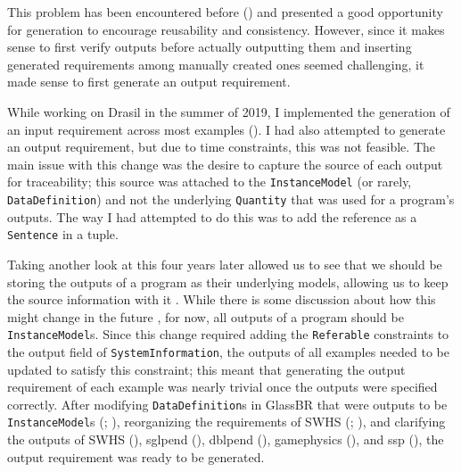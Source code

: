 This problem has been encountered before () and presented a good
opportunity for generation to encourage reusability and consistency. However,
since it makes sense to first verify outputs before actually outputting them
and inserting generated requirements among manually created ones seemed
challenging, it made sense to first generate an output requirement.

While working on Drasil in the summer of 2019, I implemented the generation
of an input requirement across most examples ().
I had also attempted to generate an output requirement, but due to time
constraints, this was not feasible. The
main issue with this change was the desire to capture the source of each output
for traceability; this source was attached to the \texttt{InstanceModel}
(or rarely, \texttt{DataDefinition}) and not the underlying \texttt{Quantity}
that was used for a program's outputs. The way I had attempted to do this was
to add the reference as a \texttt{Sentence} in a tuple.

Taking another look at this four years later allowed us to
see that we should be storing the outputs of a program as their underlying
models, allowing us to keep the source information with it
. While there is some discussion about how this might
change in the future , for now, all outputs of a program should be
\texttt{InstanceModel}s. Since this change required adding the
\texttt{Referable}  constraints to the output field of
\texttt{SystemInformation}, the outputs of all examples needed to be updated to
satisfy this constraint; this meant that generating the output requirement of
each example was nearly trivial once the outputs were specified correctly.
After modifying \texttt{DataDefinition}s in GlassBR that were outputs to be
\texttt{InstanceModel}s (; ), reorganizing the
requirements of SWHS (; ), and clarifying the
outputs of SWHS (), \acs{sglpend} (),
\acs{dblpend} (), \acs{gamephysics} (), and
\acs{ssp} (), the output requirement was ready to be generated.
